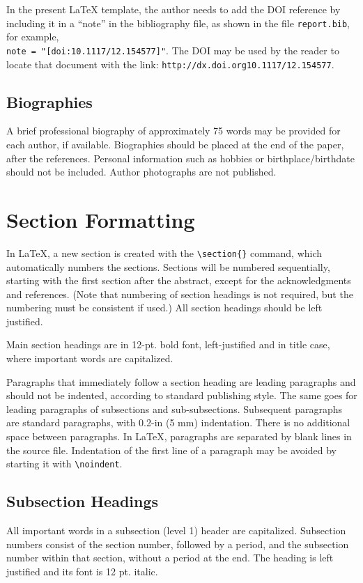 \documentclass[12pt]{spieman}  %
\begin{document}
\begin{spacing}{2}
In the present LaTeX template, the author needs to add the DOI reference by including it in a ``note'' in the bibliography file, as shown in the file {\verb+report.bib+}, for example, \\ {\verb+note = "[doi:10.1117/12.154577]"+}. The DOI may be used by the reader to locate that document with the link: {\verb+http://dx.doi.org10.1117/12.154577+}. 

\subsection{Biographies}
A brief professional biography of approximately 75 words may be provided for each author, if available. Biographies should be placed at the end of the paper, after the references. Personal information such as hobbies or birthplace/birthdate should not be included. Author photographs are not published.

\section{Section Formatting}
\label{sect:sections}
In LaTeX, a new section is created with the \verb|\section{}| command, which automatically numbers the sections. Sections will be numbered sequentially, starting with the first section after the abstract, except for the acknowledgments and references. (Note that numbering of section headings is not required, but the numbering must be consistent if used.) All section headings should be left justified.

Main section headings are in 12-pt. bold font, left-justified and in title case, where important words are capitalized.

Paragraphs that immediately follow a section heading are leading paragraphs and should not be indented, according to standard publishing style. The same goes for leading paragraphs of subsections and sub-subsections. Subsequent paragraphs are standard paragraphs, with 0.2-in (5 mm) indentation. There is no additional space between paragraphs. In LaTeX, paragraphs are separated by blank lines in the source file. Indentation of the first line of a paragraph may be avoided by starting it with \verb|\noindent|.

\subsection{Subsection Headings}
All important words in a subsection (level 1) header are capitalized. Subsection numbers consist of the section number, followed by a period, and the subsection number within that section, without a period at the end. The heading is left justified and its font is 12 pt. italic.


\end{spacing}
\end{document}
